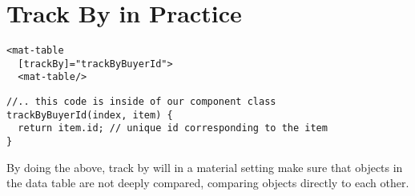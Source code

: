 \section{ Track By in Practice }
\begin{lstlisting}[caption=data-table.component.html]
  <mat-table
  [trackBy]="trackByBuyerId">
  <mat-table/>
\end{lstlisting}

\begin{lstlisting}[caption=data-table.component.ts]
//.. this code is inside of our component class  
trackByBuyerId(index, item) {    
  return item.id; // unique id corresponding to the item
}
\end{lstlisting}

By doing the above, track by will in a material setting make sure that
objects in the data table are not deeply compared, comparing objects directly to
each other. 

